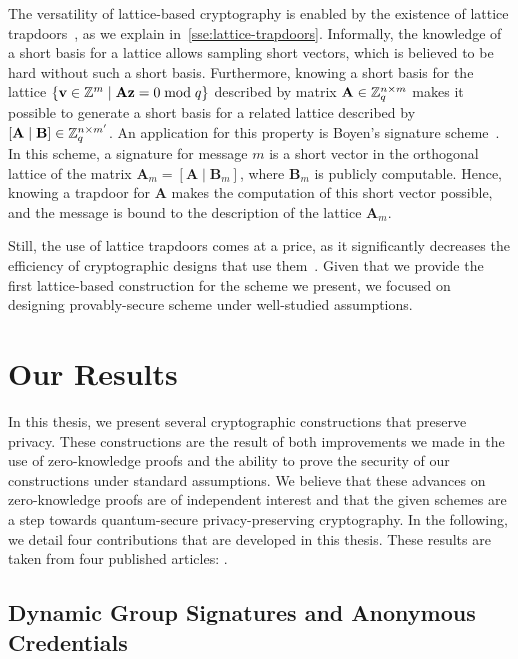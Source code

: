 The versatility of lattice-based cryptography is enabled by the existence of lattice trapdoors~\cite{GPV08,CHKP10,MP12}, as we explain in~\cref{sse:lattice-trapdoors}.
Informally, the knowledge of a short basis for a lattice allows sampling short vectors, which is believed to be hard without such a short basis.
Furthermore, knowing a short basis for the lattice $\{\mathbf{v} \in \mathbb{Z}^m \mid \mathbf{A} \mathbf{z} = 0 \bmod q\}$ described by matrix $\mathbf{A} \in \mathbb{Z}_q^{n \times m}$ makes it possible to generate a short basis for a related lattice described by $[ \mathbf{A} \mid \mathbf{B}] \in \mathbb{Z}_q^{n \times m'}$.
An application for this property is Boyen's signature scheme~\cite{Boy10}.
In this scheme, a signature for message $m$ is a short vector in the orthogonal lattice of the matrix $\mathbf{A}_m = [\mathbf{A} \mid \mathbf{B}_m]$, where $\mathbf{B}_m$ is publicly computable.
Hence, knowing a trapdoor for $\mathbf{A}$ makes the computation of this short vector possible, and the message is bound to the description of the lattice $\mathbf{A}_m$.

Still, the use of lattice trapdoors comes at a price, as it significantly decreases the efficiency of cryptographic designs that use them~\cite{Lyu12,LLNW16}.
Given that we provide the first lattice-based construction for the scheme we present, we focused on designing provably-secure scheme under well-studied assumptions.

\section{Our Results}

In this thesis, we present several cryptographic constructions that preserve privacy.
These constructions are the result of both improvements we made in the use of zero-knowledge proofs and the ability to prove the security of our constructions under standard assumptions.
We believe that these advances on zero-knowledge proofs are of independent interest and that the given schemes are a step towards quantum-secure privacy-preserving cryptography.
In the following, we detail four contributions that are developed in this thesis.
These results are taken from four published articles: \cite{LMPY16,LLM+16,LLM+16a,LLM+17}.

\subsection{Dynamic Group Signatures and Anonymous Credentials}

